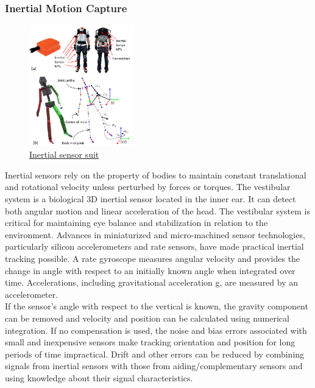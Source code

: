 \subsubsection*{Inertial Motion Capture}
\begin{figure}[h]
	\centering
	\includegraphics[width=0.4\textwidth]{figures/background/Inertial.png}
	\caption{\href{https://www.researchgate.net/profile/Matthew-Field-6/publication/257308000/figure/fig1/AS:613448983531582@1523269043700/a-The-inertial-sensor-MTx-left-14-and-positioning-of-the-sensors-and-wireless.png}
	{Inertial sensor suit}}
\end{figure}

Inertial sensors \cite{Kalman Filtering for Sensor Fusionin a Human Tracking System} rely on the property of bodies to maintain constant translational and rotational velocity unless perturbed by forces or torques. The vestibular system is a biological 3D inertial sensor located in the inner ear. It can detect both angular motion and linear acceleration of the head. The vestibular system is critical for maintaining eye balance and stabilization in relation to the environment. Advances in miniaturized and micro-machined sensor technologies, particularly silicon accelerometers and rate sensors, have made practical inertial tracking possible. A rate gyroscope measures angular velocity and provides the change in angle with respect to an initially known angle when integrated over time. Accelerations, including gravitational acceleration g, are measured by an accelerometer.\\

If the sensor's angle with respect to the vertical is known, the gravity component can be removed and velocity and position can be calculated using numerical integration. If no compensation is used, the noise and bias errors associated with small and inexpensive sensors make tracking orientation and position for long periods of time impractical. Drift and other errors can be reduced by combining signals from inertial sensors with those from aiding/complementary sensors and using knowledge about their signal characteristics.


